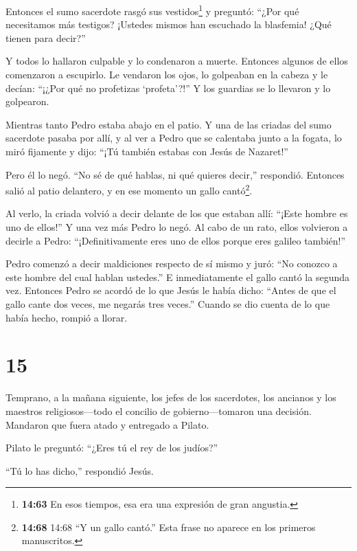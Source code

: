  Entonces el sumo sacerdote rasgó sus vestidos\footnote{\textbf{14:63}
  En esos tiempos, esa era una expresión de gran angustia.} y preguntó:
``¿Por qué necesitamos más testigos?  ¡Ustedes mismos han
escuchado la blasfemia! ¿Qué tienen para decir?''

Y todos lo hallaron culpable y lo condenaron a muerte. 
Entonces algunos de ellos comenzaron a escupirlo. Le vendaron los ojos,
lo golpeaban en la cabeza y le decían: ``¡¿Por qué no profetizas
`profeta'?!'' Y los guardias se lo llevaron y lo golpearon.

 Mientras tanto Pedro estaba abajo en el patio. Y una de
las criadas del sumo sacerdote pasaba por allí,  y al ver a
Pedro que se calentaba junto a la fogata, lo miró fijamente y dijo:
``¡Tú también estabas con Jesús de Nazaret!''

 Pero él lo negó. ``No sé de qué hablas, ni qué quieres
decir,'' respondió. Entonces salió al patio delantero, y en ese momento
un gallo cantó\footnote{\textbf{14:68} 14:68 ``Y un gallo cantó.'' Esta
  frase no aparece en los primeros manuscritos.}.

 Al verlo, la criada volvió a decir delante de los que
estaban allí: ``¡Este hombre es uno de ellos!''  Y una vez
más Pedro lo negó. Al cabo de un rato, ellos volvieron a decirle a
Pedro: ``¡Definitivamente eres uno de ellos porque eres galileo
también!''

 Pedro comenzó a decir maldiciones respecto de sí mismo y
juró: ``No conozco a este hombre del cual hablan ustedes.''
 E inmediatamente el gallo cantó la segunda vez. Entonces
Pedro se acordó de lo que Jesús le había dicho: ``Antes de que el gallo
cante dos veces, me negarás tres veces.'' Cuando se dio cuenta de lo que
había hecho, rompió a llorar.

\hypertarget{section-14}{%
\section{15}\label{section-14}}

 Temprano, a la mañana siguiente, los jefes de los
sacerdotes, los ancianos y los maestros religiosos---todo el concilio de
gobierno---tomaron una decisión. Mandaron que fuera atado y entregado a
Pilato.

 Pilato le preguntó: ``¿Eres tú el rey de los judíos?''

``Tú lo has dicho,'' respondió Jesús.

